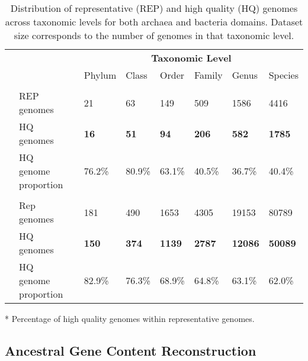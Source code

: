 \normalsize
\begin{table}[!h]
    \centering
    \begin{threeparttable}
    \caption{Distribution of representative (REP) and high quality (HQ) genomes across taxonomic levels for both archaea and bacteria domains. Dataset size corresponds to the number of genomes in that taxonomic level.}
    \label{gtdb_stats_no}
    \begin{tabular}{lllllllll}
    \addlinespace[1.5ex]
    &  &  & \multicolumn{6}{c}{\textbf{Taxonomic Level}} \\
    \cmidrule{4-9}
    &  &  & Phylum & Class & Order & Family & Genus & Species \\
    \midrule
    \addlinespace[1.5ex]
    \multicolumn{2}{l}{\textbf{Archaea}} \\
    & REP genomes &  & 21 & 63 & 149 & 509 & 1586 & 4416 \\
    & HQ genomes  &  & \textbf{16} & \textbf{51} & \textbf{94} & \textbf{206} & \textbf{582} & \textbf{1785} \\
    & HQ genome proportion\tnote{*} &  & 76.2\% & 80.9\% & 63.1\% & 40.5\% & 36.7\% & 40.4\% \\
    \addlinespace[1.5ex]
    \multicolumn{2}{l}{\textbf{Bacteria}} \\
    & Rep genomes &  & 181 & 490 & 1653 & 4305 & 19153 & 80789 \\
    & HQ genomes &  & \textbf{150} & \textbf{374} & \textbf{1139} & \textbf{2787} & \textbf{12086} & \textbf{50089} \\
    & HQ genome proportion &  & 82.9\% & 76.3\% & 68.9\% & 64.8\% & 63.1\% & 62.0\% \\
    \bottomrule
    \end{tabular}

    \begin{tablenotes}
        \footnotesize
        \item[*] Percentage of high quality genomes within representative genomes.
    \end{tablenotes}
    \end{threeparttable}

\end{table}



\subsection*{Ancestral Gene Content Reconstruction}

